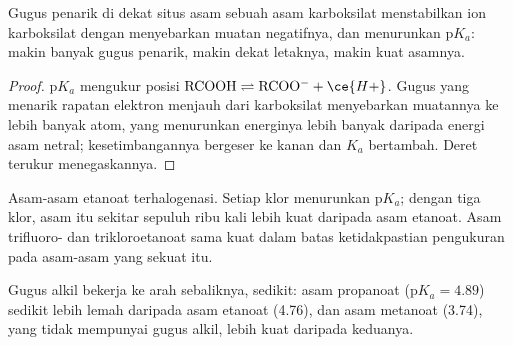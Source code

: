 \begin{proposition}\label{prop:b1:electronic-effects:inductive-pka}
Gugus penarik di dekat situs asam sebuah asam karboksilat menstabilkan
ion karboksilat dengan menyebarkan muatan negatifnya, dan menurunkan
$\mathrm{p}K_a$: makin banyak gugus penarik, makin dekat letaknya, makin
kuat asamnya.
\end{proposition}

\begin{proof}
$\mathrm{p}K_a$ mengukur posisi $\mathrm{RCOOH} \rightleftharpoons
\mathrm{RCOO^-} + \ce{H+}$. Gugus yang menarik rapatan elektron menjauh
dari karboksilat menyebarkan muatannya ke lebih banyak atom, yang
menurunkan energinya lebih banyak daripada energi asam netral;
kesetimbangannya bergeser ke kanan dan $K_a$ bertambah. Deret terukur
menegaskannya.
\end{proof}

\begin{omfigure}

{\small Asam-asam etanoat terhalogenasi. Setiap klor menurunkan
$\mathrm{p}K_a$; dengan tiga klor, asam itu sekitar sepuluh ribu kali
lebih kuat daripada asam etanoat. Asam trifluoro- dan trikloroetanoat
sama kuat dalam batas ketidakpastian pengukuran pada asam-asam yang
sekuat itu.}
\end{omfigure}

Gugus alkil bekerja ke arah sebaliknya, sedikit: asam propanoat
($\mathrm{p}K_a
= 4.89$) sedikit lebih lemah daripada asam etanoat (4.76), dan asam
metanoat (3.74), yang tidak mempunyai gugus alkil, lebih kuat daripada
keduanya.

